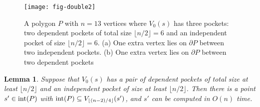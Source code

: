 \documentclass[12pt]{article}
\newcommand{\floor}[1]{{\lfloor #1 \rfloor}}
\newtheorem{lemma}{Lemma}
\begin{document}
\begin{figure}[htp]
  \centering
  \texttt{[image: fig-double2]}
  \caption{\label{fig:double2}
A polygon $P$ with $n=13$ vertices where $V_0(s)$ has three pockets: two dependent pockets of total size $\floor{n/2} =6$ and an independent pocket of size $\floor{n/2}=6$.
(a) One extra vertex lies on $\partial P$ between two independent pockets.
(b) One extra vertex lies on $\partial P$ between two dependent pockets}
\end{figure}

\begin{lemma}\label{lem:violate2}
Suppose that $V_0(s)$ has a pair of dependent pockets of total size at least $\floor{n/2}$ and
an independent pocket of size at least $\floor{n/2}$. Then there is a point $s'\in {\rm int}(P)$ with
${\rm int}(P)\subseteq V_{\floor{(n-2)/4}}(s')$, and $s'$ can be computed in $O(n)$ time.
\end{lemma}
\end{document}
